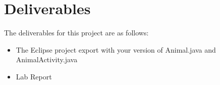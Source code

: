 \section{Deliverables}

The deliverables for this project are as follows:

\begin{itemize}
	\item The Eclipse project export with your version of Animal.java and AnimalActivity.java
\end{itemize}
\begin{itemize}
	\item Lab Report
\end{itemize}

